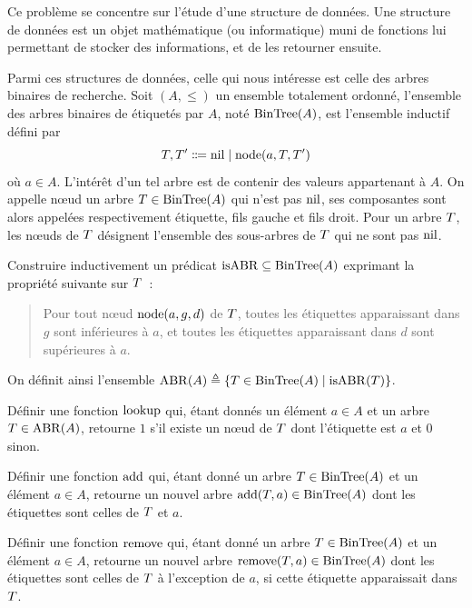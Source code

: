 \begin{problem}
  Ce problème se concentre sur l'étude d'une structure de données. Une structure
  de données est un objet mathématique (ou informatique) muni de fonctions
  lui permettant de stocker des informations, et de les retourner ensuite.

  
  Parmi ces structures de données, celle qui nous intéresse est celle des arbres
  binaires de recherche. Soit $(A,\leq)$ un ensemble totalement ordonné,
  l'ensemble des arbres binaires de
  étiquetés par $A$, noté $\operatorname{BinTree}(A)$, est l'ensemble inductif
  défini par
  \[\varTree,\varTree' \inddefeq \nil \mid \node(a,\varTree,\varTree')\]
  où $a \in A$. L'intérêt d'un tel arbre est de contenir des valeurs appartenant
  à $A$. On appelle n\oe ud un arbre $T \in \operatorname{BinTree}(A)$ qui n'est pas
  $\operatorname{nil}$, ses composantes sont alors appelées respectivement étiquette, fils
  gauche et fils droit. Pour un arbre $T$, les n\oe uds de $T$
  désignent l'ensemble des sous-arbres de $T$ qui ne sont pas $\operatorname{nil}$.

  \begin{pbQuest}
  \item Construire inductivement un prédicat $\operatorname{isABR} \subseteq \operatorname{BinTree}(A)$
    exprimant la propriété suivante sur $T$~:
    \begin{quotation}
      \noindent
      Pour tout n\oe ud $\operatorname{node}(a,g,d)$ de $T$, toutes les étiquettes
      apparaissant dans $g$ sont inférieures à $a$, et toutes les étiquettes
      apparaissant dans $d$ sont supérieures à $a$.
    \end{quotation}
    On définit ainsi l'ensemble
    $\operatorname{ABR}(A) \triangleq \left\{ T \in \operatorname{BinTree}(A) \;\middle\vert\; \operatorname{isABR}(T) \right\}$.
  \item Définir une fonction $\operatorname{lookup}$ qui, étant donnés un élément $a \in A$
    et un arbre $T \in \operatorname{ABR}(A)$, retourne $1$ s'il existe un n\oe ud de
    $T$ dont l'étiquette est $a$ et $0$ sinon.
  \item Définir une fonction $\operatorname{add}$ qui, étant donné un arbre
    $T \in \operatorname{BinTree}(A)$ et un élément $a \in A$, retourne un nouvel arbre
    $\operatorname{add}(T,a) \in \operatorname{BinTree}(A)$ dont les étiquettes sont celles de
    $T$ et $a$.
  \item Définir une fonction $\operatorname{remove}$ qui, étant donné un arbre
    $T\in\operatorname{BinTree}(A)$ et un élément $a \in A$, retourne un nouvel arbre
    $\operatorname{remove}(T,a) \in \operatorname{BinTree}(A)$ dont les étiquettes sont celles de
    $T$ à l'exception de $a$, si cette étiquette apparaissait dans
    $T$.
  \end{pbQuest}


\end{problem}
